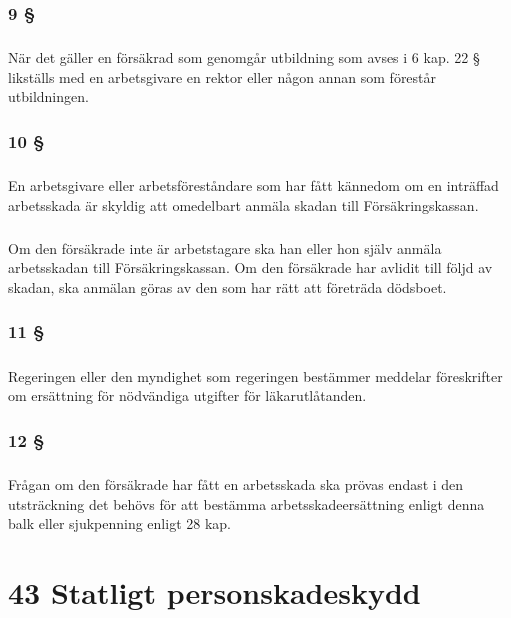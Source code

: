 \documentclass[a4paper,notitlepage,openany,10pt]{book}
\begin{document}
\subsection*{9 §}
\paragraph*{}
När det gäller en försäkrad som genomgår utbildning som avses i 6 kap. 22 § likställs med en arbetsgivare en rektor eller någon annan som förestår utbildningen.
\subsection*{10 §}
\paragraph*{}
En arbetsgivare eller arbetsföreståndare som har fått kännedom om en inträffad arbetsskada är skyldig att omedelbart anmäla skadan till Försäkringskassan.
\paragraph*{}
Om den försäkrade inte är arbetstagare ska han eller hon själv anmäla arbetsskadan till Försäkringskassan. Om den försäkrade har avlidit till följd av skadan, ska anmälan göras av den som har rätt att företräda dödsboet.
\subsection*{11 §}
\paragraph*{}
Regeringen eller den myndighet som regeringen bestämmer meddelar föreskrifter om ersättning för nödvändiga utgifter för läkarutlåtanden.
\subsection*{12 §}
\paragraph*{}
Frågan om den försäkrade har fått en arbetsskada ska prövas endast i den utsträckning det behövs för att bestämma arbetsskadeersättning enligt denna balk eller sjukpenning enligt 28 kap.
\chapter*{43 Statligt personskadeskydd}
\end{document}

